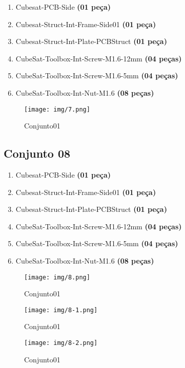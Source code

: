 \begin{enumerate}[label*=\ref*{subs:c07}\arabic*]
	\item Cubesat-PCB-Side \textbf{(01 peça)}
	\item Cubesat-Struct-Int-Frame-Side01 \textbf{(01 peça)}
	\item Cubesat-Struct-Int-Plate-PCBStruct \textbf{(01 peça)}
	\item CubeSat-Toolbox-Int-Screw-M1.6-12mm \textbf{(04 peças)}
	\item CubeSat-Toolbox-Int-Screw-M1.6-5mm \textbf{(04 peças)}
	\item CubeSat-Toolbox-Int-Nut-M1.6 \textbf{(08 peças)}
\end{enumerate}

\begin{figure}[ht!]
	\centering
	\texttt{[image: img/7.png]}
	\caption{Conjunto01}
	\label{7}
\end{figure}



\newpage
\subsection{Conjunto 08}\label{subs:c08}

\begin{enumerate}[label*=\ref*{subs:c08}\arabic*]
	\item Cubesat-PCB-Side \textbf{(01 peça)}
	\item Cubesat-Struct-Int-Frame-Side01 \textbf{(01 peça)}
	\item Cubesat-Struct-Int-Plate-PCBStruct \textbf{(01 peça)}
	\item CubeSat-Toolbox-Int-Screw-M1.6-12mm \textbf{(04 peças)}
	\item CubeSat-Toolbox-Int-Screw-M1.6-5mm \textbf{(04 peças)}
	\item CubeSat-Toolbox-Int-Nut-M1.6 \textbf{(08 peças)}
\end{enumerate}

\begin{figure}[ht!]
	\centering
	\texttt{[image: img/8.png]}
	\caption{Conjunto01}
	\label{8}
\end{figure}

\begin{figure}[ht!]
	\centering
	\texttt{[image: img/8-1.png]}
	\caption{Conjunto01}
	\label{8-1}
\end{figure}

\begin{figure}[ht!]
	\centering
	\texttt{[image: img/8-2.png]}
	\caption{Conjunto01}
	\label{8-2}
\end{figure}

